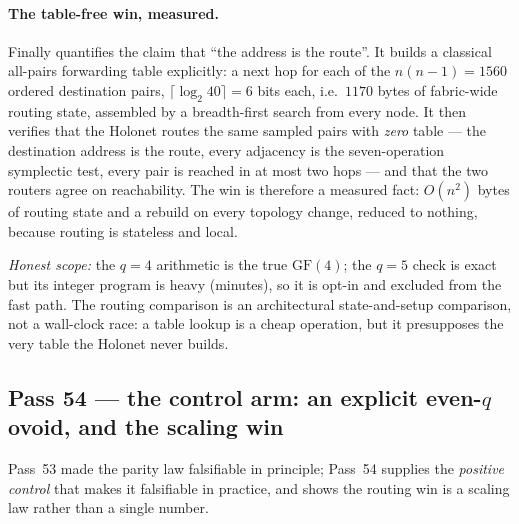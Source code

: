 \documentclass[11pt]{article}
\begin{document}
\paragraph{The table-free win, measured.}  Finally 
quantifies the claim that ``the address is the route''.  It builds a classical
all-pairs forwarding table explicitly: a next hop for each of the \(n(n-1)=1560\)
ordered destination pairs, \(\lceil\log_2 40\rceil=6\) bits each, i.e.\ \(1170\)
bytes of fabric-wide routing state, assembled by a breadth-first search from every
node.  It then verifies that the Holonet routes the same sampled pairs with
\emph{zero} table --- the destination address is the route, every adjacency is the
seven-operation symplectic test, every pair is reached in at most two hops --- and
that the two routers agree on reachability.  The win is therefore a measured fact:
\(O(n^2)\) bytes of routing state and a rebuild on every topology change, reduced
to nothing, because routing is stateless and local.

\emph{Honest scope:} the \(q=4\) arithmetic is the true \(\mathrm{GF}(4)\); the
\(q=5\) check is exact but its integer program is heavy (minutes), so it is opt-in
and excluded from the fast path.  The routing comparison is an
architectural state-and-setup comparison, not a wall-clock race: a table lookup is
a cheap operation, but it presupposes the very table the Holonet never builds.

\subsection{Pass 54 --- the control arm: an explicit even-\(q\) ovoid, and the scaling win}
\label{sec:capstone-fiftyfour}

Pass~53 made the parity law falsifiable in principle; Pass~54 supplies the
\emph{positive control} that makes it falsifiable in practice, and shows the
routing win is a scaling law rather than a single number.
\end{document}
